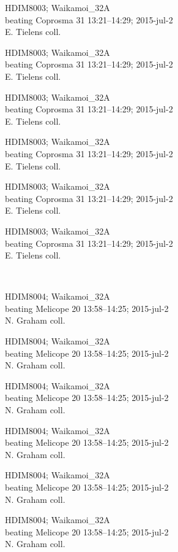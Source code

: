 \documentclass[2pt]{extarticle}
\begin{document}
\noindent
\parbox{0.16\textwidth}{\tiny \raggedright \rule[-0.3\baselineskip]{0pt}{10pt}HDIM8003; Waikamoi\_32A\\ beating Coprosma 31 13:21--14:29; 2015-jul-2\\ E. Tielens coll.}
\parbox{0.16\textwidth}{\tiny \raggedright \rule[-0.3\baselineskip]{0pt}{10pt}HDIM8003; Waikamoi\_32A\\ beating Coprosma 31 13:21--14:29; 2015-jul-2\\ E. Tielens coll.}
\parbox{0.16\textwidth}{\tiny \raggedright \rule[-0.3\baselineskip]{0pt}{10pt}HDIM8003; Waikamoi\_32A\\ beating Coprosma 31 13:21--14:29; 2015-jul-2\\ E. Tielens coll.}
\parbox{0.16\textwidth}{\tiny \raggedright \rule[-0.3\baselineskip]{0pt}{10pt}HDIM8003; Waikamoi\_32A\\ beating Coprosma 31 13:21--14:29; 2015-jul-2\\ E. Tielens coll.}
\parbox{0.16\textwidth}{\tiny \raggedright \rule[-0.3\baselineskip]{0pt}{10pt}HDIM8003; Waikamoi\_32A\\ beating Coprosma 31 13:21--14:29; 2015-jul-2\\ E. Tielens coll.}
\parbox{0.16\textwidth}{\tiny \raggedright \rule[-0.3\baselineskip]{0pt}{10pt}HDIM8003; Waikamoi\_32A\\ beating Coprosma 31 13:21--14:29; 2015-jul-2\\ E. Tielens coll.} \\ 
\vspace{0.001in} 

\noindent
\parbox{0.16\textwidth}{\tiny \raggedright \rule[-0.3\baselineskip]{0pt}{10pt}HDIM8004; Waikamoi\_32A\\ beating Melicope 20 13:58--14:25; 2015-jul-2\\ N. Graham coll.}
\parbox{0.16\textwidth}{\tiny \raggedright \rule[-0.3\baselineskip]{0pt}{10pt}HDIM8004; Waikamoi\_32A\\ beating Melicope 20 13:58--14:25; 2015-jul-2\\ N. Graham coll.}
\parbox{0.16\textwidth}{\tiny \raggedright \rule[-0.3\baselineskip]{0pt}{10pt}HDIM8004; Waikamoi\_32A\\ beating Melicope 20 13:58--14:25; 2015-jul-2\\ N. Graham coll.}
\parbox{0.16\textwidth}{\tiny \raggedright \rule[-0.3\baselineskip]{0pt}{10pt}HDIM8004; Waikamoi\_32A\\ beating Melicope 20 13:58--14:25; 2015-jul-2\\ N. Graham coll.}
\parbox{0.16\textwidth}{\tiny \raggedright \rule[-0.3\baselineskip]{0pt}{10pt}HDIM8004; Waikamoi\_32A\\ beating Melicope 20 13:58--14:25; 2015-jul-2\\ N. Graham coll.}
\parbox{0.16\textwidth}{\tiny \raggedright \rule[-0.3\baselineskip]{0pt}{10pt}HDIM8004; Waikamoi\_32A\\ beating Melicope 20 13:58--14:25; 2015-jul-2\\ N. Graham coll.} \\ 
\vspace{0.001in} 
\end{document}
